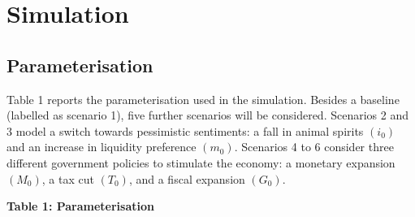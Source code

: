 \documentclass[
  letterpaper,
  DIV=11,
  numbers=noendperiod]{scrreprt}
\begin{document}
\section{Simulation}\label{simulation-1}

\subsection{Parameterisation}\label{parameterisation-1}

Table 1 reports the parameterisation used in the simulation. Besides a
baseline (labelled as scenario 1), five further scenarios will be
considered. Scenarios 2 and 3 model a switch towards pessimistic
sentiments: a fall in animal spirits \(\left(i_{0}\right)\) and an
increase in liquidity preference \(\left(m_{0}\right)\). Scenarios 4 to
6 consider three different government policies to stimulate the economy:
a monetary expansion \(\left(M_{0}\right)\), a tax cut
\(\left(T_{0}\right)\), and a fiscal expansion \(\left(G_{0}\right)\).

\textbf{Table 1: Parameterisation}
\end{document}

